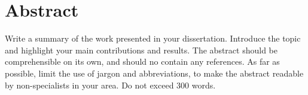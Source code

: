 
\chapter*{Abstract}

Write a summary of the work presented in your dissertation.
Introduce the topic and highlight your main contributions and results.
The abstract should be comprehensible on its own, and should no contain any
references.
As far as possible, limit the use of jargon and abbreviations, to make the
abstract readable by non-specialists in your area.
Do not exceed 300 words.
